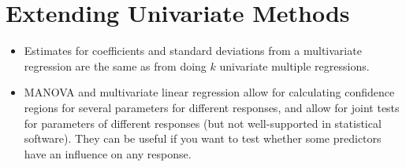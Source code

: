 \documentclass[a4paper]{article}
\begin{document}
\section{Extending Univariate Methods}

\begin{itemize}
    \item Estimates for coefficients and standard deviations from a multivariate regression are the same as from doing $k$ univariate multiple regressions.
    \item MANOVA and multivariate linear regression allow for calculating confidence regions for several parameters for different responses, and allow for joint tests for parameters of different responses (but not well-supported in statistical software). They can be useful if you want to test whether some predictors have an influence on any response.
\end{itemize}
\end{document}
